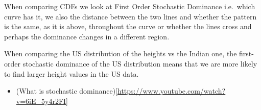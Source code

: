 \documentclass[]{book}
\providecommand{\tightlist}{%
  \setlength{\itemsep}{0pt}\setlength{\parskip}{0pt}}
\theoremstyle{definition}
\theoremstyle{definition}
\theoremstyle{definition}
\theoremstyle{remark}
\begin{document}
When comparing CDFs we look at First Order Stochastic Dominance
i.e.~which curve has it, we also the distance between the two lines and
whether the pattern is the same, as it is above, throughout the curve or
whether the lines cross and perhaps the dominance changes in a different
region.

When comparing the US distribution of the heights vs the Indian one, the
first-order stochastic dominance of the US distribution means that we
are more likely to find larger height values in the US data.

\begin{itemize}
\tightlist
\item
  (What is stochastic
  dominance){[}\url{https://www.youtube.com/watch?v=6iE_5y4r2FI}{]}
\end{itemize}


\end{document}
